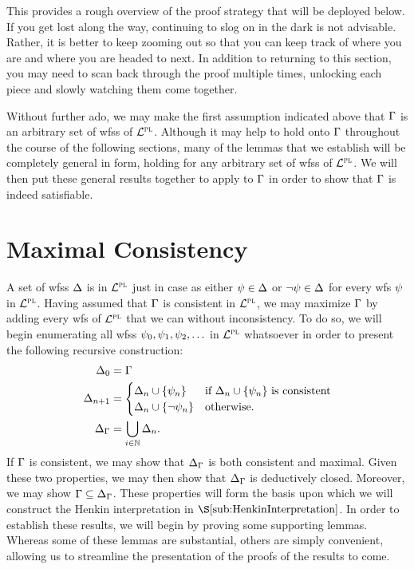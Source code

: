 This provides a rough overview of the proof strategy that will be deployed below.
If you get lost along the way, continuing to slog on in the dark is not advisable.
Rather, it is better to keep zooming out so that you can keep track of where you are and where you are headed to next.
In addition to returning to this section, you may need to scan back through the proof multiple times, unlocking each piece and slowly watching them come together.

Without further ado, we may make the first assumption indicated above that $\Gamma$ is an arbitrary set of wfss of $\mathcal{L}^{\textsc{pl}}$. 
Although it may help to hold onto $\Gamma$ throughout the course of the following sections, many of the lemmas that we establish will be completely general in form, holding for any arbitrary set of wfss of $\mathcal{L}^{\textsc{pl}}$.
We will then put these general results together to apply to $\Gamma$ in order to show that $\Gamma$ is indeed satisfiable. 


\section{Maximal Consistency}%
  \label{sec:PL-Maximization}
  
A set of wfss $\Delta$ is  in $\mathcal{L}^{\textsc{pl}}$ just in case as either $\psi\in\Delta$ or $\neg\psi\in\Delta$ for every wfs $\psi$ in $\mathcal{L}^{\textsc{pl}}$.
Having assumed that $\Gamma$ is consistent in $\mathcal{L}^{\textsc{pl}}$, we may maximize $\Gamma$ by adding every wfs of $\mathcal{L}^{\textsc{pl}}$ that we can without inconsistency. 
To do so, we will begin enumerating all wfss $\psi_0,\psi_1,\psi_2,\ldots$ in $\mathcal{L}^{\textsc{pl}}$ whatsoever in order to present the following recursive construction:
\begin{align*}
  \Delta_0     &= \Gamma \\
  \Delta_{n+1} &= 
    \begin{cases}
      \Delta_n\cup\lbrace\psi_n\rbrace &\text{if } \Delta_n\cup\lbrace\psi_n\rbrace \text{ is consistent}\\
      \Delta_n\cup\lbrace\neg\psi_n\rbrace &\text{otherwise}.
    \end{cases}\\
  \Delta_{\Gamma} &= \bigcup_{i\in\mathbb{N}}\Delta_n. 
\end{align*}
If $\Gamma$ is consistent, we may show that $\Delta_{\Gamma}$ is both consistent and maximal.
Given these two properties, we may then show that $\Delta_{\Gamma}$ is deductively closed.
Moreover, we may show $\Gamma\subseteq\Delta_{\Gamma}$.
These properties will form the basis upon which we will construct the Henkin interpretation in $\S\ref{sub:HenkinInterpretation}$.
In order to establish these results, we will begin by proving some supporting lemmas.
Whereas some of these lemmas are substantial, others are simply convenient, allowing us to streamline the presentation of the proofs of the results to come.


